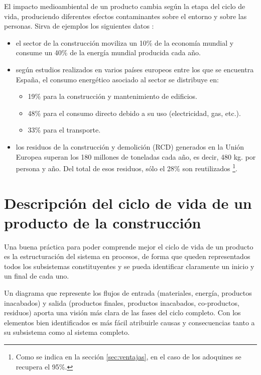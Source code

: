 El impacto medioambiental de un producto cambia según la etapa del ciclo de vida, produciendo diferentes efectos contaminantes sobre el entorno y sobre las personas. Sirva de ejemplos los siguientes datos \cite{carvalho}:
\begin{itemize}
\item el sector de la construcción moviliza un 10\% de la economía mundial y consume un 40\% de la energía mundial producida cada año.
\item según estudios realizados en varios países europeos entre los que se encuentra España, el consumo energético asociado al sector se distribuye en:
  \begin{itemize}
  \item 19\% para la construcción y mantenimiento de edificios.
  \item 48\% para el consumo directo debido a su uso (electricidad, gas, etc.).
  \item 33\% para el transporte.
  \end{itemize}
  \item los residuos de la construcción y demolición (RCD) generados en la Unión Europea superan los 180 millones de toneladas cada año, es decir, 480 kg. por persona y año. Del total de esos residuos, sólo el 28\% son reutilizados \footnote{Como se indica en la sección \ref{sec:ventajas}, en el caso de los adoquines se recupera el 95\%.}.
\end{itemize}

\section{Descripción del ciclo de vida de un producto de la construcción}
Una buena práctica para poder comprende mejor el ciclo de vida de un producto es la estructuración del sistema en procesos, de forma que queden representados todos los subsistemas constituyentes y se pueda identificar claramente un inicio y un final de cada uno.

Un diagrama que represente los flujos de entrada (materiales, energía, productos inacabados) y salida (productos finales, productos inacabados, co-productos, residuos) aporta una visión más clara de las fases del ciclo completo. Con los elementos bien identificados es más fácil atribuirle causas y consecuencias tanto a su subsistema como al sistema completo.

